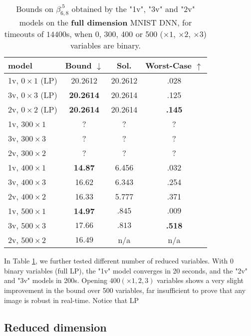 	
	\begin{table}[h!]
		\centering
	\begin{tabular}{||l||c|c|c||}\hline\hline
		model &        Bound $\downarrow$ &  Sol. &      Worst-Case $\uparrow$ \\\hline \hline
		1v, $0 \times 1$ (LP) & 20.2612  & 20.2612  & .028 \\\hline 
		3v, $0 \times 3$ (LP) & {\bf 20.2614}  & 20.2614  & .125 \\\hline 
	    2v, $0 \times 2$ (LP) & {\bf 20.2614}  & 20.2614  & {\bf .145} \\\hline\hline	 

		1v, $300 \times 1$ & ? & ? & ? \\\hline 
		3v, $300 \times 3$ & ? & ? & ? \\\hline 
	    2v, $300 \times 2$ & ? & ? & ? \\\hline\hline	 

		1v, $400 \times 1$ & {\bf 14.87} & 6.456 & .032 \\\hline 
		3v, $400 \times 3$ & 16.62 & 6.343 & .254 \\\hline 
	    2v, $400 \times 2$ & 16.33 & 5.777 & .371 \\\hline \hline

		1v, $500 \times 1$ & {\bf 14.97} & $.845$ & $.009$ \\\hline 
		3v, $500 \times 3$ & $17.66$ & $.813$ & {\bf .518} \\\hline 
	    2v, $500 \times 2$ & $16.49$ & n/a & n/a \\\hline\hline	 
	\end{tabular}
	\caption{Bounds on $\beta^{.5}_{6,8}$ 
	obtained by the "1v", "3v" and "2v" models 
	on the {\bf full dimension} MNIST DNN, 
	for timeouts of $14400$s, when 0, 300, 400 or 500 ($\times 1$, $\times 2$, $\times 3$) variables are binary.}
	\label{table.mnist}
\end{table}

In Table \ref{table.mnist}, we further tested different number of reduced variables. 
With 0 binary variables (full LP), the "1v" model converges in 20 seconds, and the "2v" and "3v" models in 200s.
Opening $400 (\times 1,2,3)$ variables shows a very slight improvement in the bound over 500 variables, 
far insufficient to prove that any image is robust in real-time. Notice that LP

\subsection{Reduced dimension}

